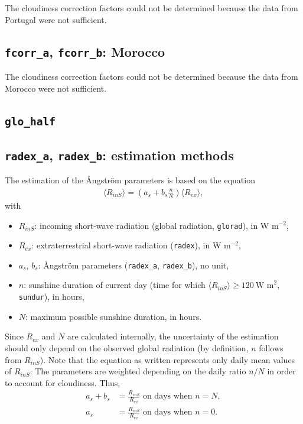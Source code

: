 \documentclass{scrreprt}
\begin{document}
The cloudiness correction factors could not be determined because the data from Portugal were not sufficient.

\subsection{\texttt{fcorr\_a}, \texttt{fcorr\_b}: Morocco} \label{ssec:parest_rad_fcorrmorocco}

The cloudiness correction factors could not be determined because the data from Morocco were not sufficient.

\subsection{\texttt{glo\_half}} \label{ssec:parest_rad_glohalf}

\subsection{\texttt{radex\_a}, \texttt{radex\_b}: estimation methods} \label{ssec:parest_rad_radexmethods}

The estimation of the {\AA}ngstr\"om parameters is based on the equation
\begin{align} \label{eq:R1}
  \langle R_{inS} \rangle = \left (  a_s + b_s \frac{n}{N} \right ) \langle R_{ex} \rangle,
\end{align}
%
with
\begin{itemize}
  \item[] $R_{inS}$: incoming short-wave radiation (global radiation, \verb!glorad!), in W m$^{-2}$,
  \item[] $R_{ex}$: extraterrestrial short-wave radiation (\verb!radex!), in W m$^{-2}$,
  \item[] $a_s$, $b_s$: {\AA}ngstr\"om parameters (\verb!radex_a!, \verb!radex_b!), no unit,
  \item[] $n$: sunshine duration of current day (time for which $\langle R_{inS} \rangle \geq 120~\text{W~m}^2$, \verb!sundur!), in hours,
  \item[] $N$: maximum possible sunshine duration, in hours.
\end{itemize}

Since $R_{ex}$ and $N$ are calculated internally, the uncertainty of the estimation should only depend on the observed global radiation (by definition, $n$ follows from $R_{inS}$).
Note that the equation as written represents only daily mean values of $R_{inS}$:
The parameters are weighted depending on the daily ratio $n/N$ in order to account for cloudiness.
Thus,
\begin{align}
  a_s + b_s &= \frac{R_{inS}}{R_{ex}} \text{ on days when } n=N, \label{eq:R2} \\
  a_s &= \frac{R_{inS}}{R_{ex}} \text{ on days when } n=0. \label{eq:R3}
\end{align}
\end{document}
